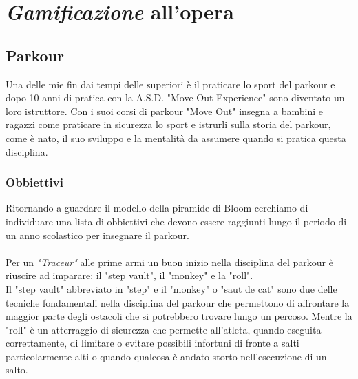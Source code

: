 \chapter{\textit{Gamificazione} all'opera}
\section{Parkour}
Una delle mie fin dai tempi delle superiori è il praticare lo sport del parkour e dopo 10 anni di pratica con la A.S.D. "Move Out Experience" sono diventato un loro istruttore. Con i suoi corsi di parkour "Move Out" insegna a bambini e ragazzi come praticare in sicurezza lo sport e istrurli sulla storia del parkour, come è nato, il suo sviluppo e la mentalità da assumere quando si pratica questa disciplina.

\subsection{Obbiettivi}
Ritornando a guardare il modello della piramide di Bloom cerchiamo di individuare una lista di obbiettivi che devono essere raggiunti lungo il periodo di un anno scolastico per insegnare il parkour.\\
\\
Per un \textit{"Traceur"} alle prime armi un buon inizio nella disciplina del parkour è riuscire ad imparare: il "step vault", il "monkey" e la "roll".\\
Il "step vault" abbreviato in "step" e il "monkey" o "saut de cat" sono due delle tecniche fondamentali nella disciplina del parkour che permettono di affrontare la maggior parte degli ostacoli che si potrebbero trovare lungo un percoso. Mentre la "roll" è un atterraggio di sicurezza che permette all'atleta, quando eseguita correttamente, di limitare o evitare possibili infortuni di fronte a salti particolarmente alti o quando qualcosa è andato storto nell'esecuzione di un salto.

